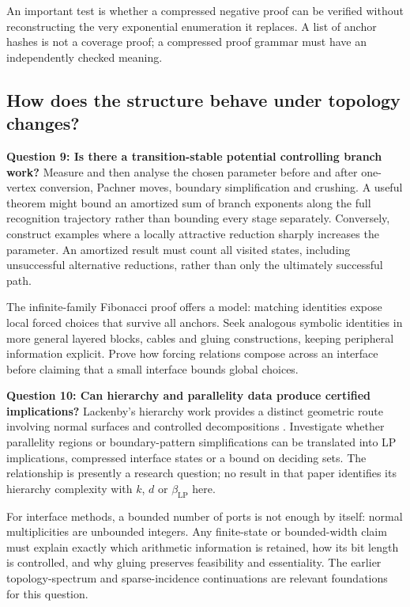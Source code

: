 An important test is whether a compressed negative proof can be verified without reconstructing the very exponential enumeration it replaces. A list of anchor hashes is not a coverage proof; a compressed proof grammar must have an independently checked meaning.

\subsection{How does the structure behave under topology changes?}

\textbf{Question 9: Is there a transition-stable potential controlling branch work?}
Measure and then analyse the chosen parameter before and after one-vertex conversion, Pachner moves, boundary simplification and crushing. A useful theorem might bound an amortized sum of branch exponents along the full recognition trajectory rather than bounding every stage separately. Conversely, construct examples where a locally attractive reduction sharply increases the parameter. An amortized result must count all visited states, including unsuccessful alternative reductions, rather than only the ultimately successful path.

The infinite-family Fibonacci proof offers a model: matching identities expose local forced choices that survive all anchors. Seek analogous symbolic identities in more general layered blocks, cables and gluing constructions, keeping peripheral information explicit. Prove how forcing relations compose across an interface before claiming that a small interface bounds global choices.

\textbf{Question 10: Can hierarchy and parallelity data produce certified implications?}
Lackenby's hierarchy work provides a distinct geometric route involving normal surfaces and controlled decompositions \cite{Lackenby2026}. Investigate whether parallelity regions or boundary-pattern simplifications can be translated into LP implications, compressed interface states or a bound on deciding sets. The relationship is presently a research question; no result in that paper identifies its hierarchy complexity with $k$, $d$ or $\beta_{\mathrm{LP}}$ here.

For interface methods, a bounded number of ports is not enough by itself: normal multiplicities are unbounded integers. Any finite-state or bounded-width claim must explain exactly which arithmetic information is retained, how its bit length is controlled, and why gluing preserves feasibility and essentiality. The earlier topology-spectrum and sparse-incidence continuations are relevant foundations for this question.

